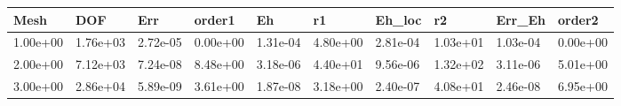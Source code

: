 \begin{tabular}{llllllllll}
Mesh & DOF & Err & order1 & Eh & r1 & Eh_loc & r2 & Err_Eh & order2 \\ 
\hline 
1.00e+00 & 1.76e+03 & 2.72e-05 & 0.00e+00 & 1.31e-04 & 4.80e+00 & 2.81e-04 & 1.03e+01 & 1.03e-04 & 0.00e+00 \\ 
2.00e+00 & 7.12e+03 & 7.24e-08 & 8.48e+00 & 3.18e-06 & 4.40e+01 & 9.56e-06 & 1.32e+02 & 3.11e-06 & 5.01e+00 \\ 
3.00e+00 & 2.86e+04 & 5.89e-09 & 3.61e+00 & 1.87e-08 & 3.18e+00 & 2.40e-07 & 4.08e+01 & 2.46e-08 & 6.95e+00 \\ 
\hline 
\end{tabular}